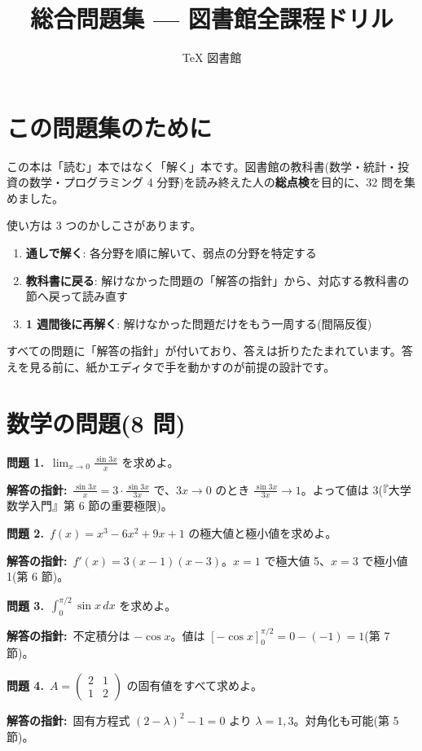 \documentclass{article}
\title{総合問題集 — 図書館全課程ドリル}
\author{TeX 図書館}
\begin{document}
\section{この問題集のために}

この本は「読む」本ではなく「解く」本です。図書館の教科書(数学・統計・投資の数学・プログラミング 4 分野)を読み終えた人の\textbf{総点検}を目的に、32 問を集めました。

使い方は 3 つのかしこさがあります。

\begin{enumerate}
\item \textbf{通しで解く}: 各分野を順に解いて、弱点の分野を特定する
\item \textbf{教科書に戻る}: 解けなかった問題の「解答の指針」から、対応する教科書の節へ戻って読み直す
\item \textbf{1 週間後に再解く}: 解けなかった問題だけをもう一周する(間隔反復)
\end{enumerate}

すべての問題に「解答の指針」が付いており、答えは折りたたまれています。答えを見る前に、紙かエディタで手を動かすのが前提の設計です。

\section{数学の問題(8 問)}

\textbf{問題 1.}\ \(\displaystyle \lim_{x \to 0} \frac{\sin 3x}{x} \) を求めよ。

\textbf{解答の指針:}\ \(\frac{\sin 3x}{x} = 3 \cdot \frac{\sin 3x}{3x}\) で、\(3x \to 0\) のとき \(\frac{\sin 3x}{3x} \to 1\)。よって値は 3(『大学数学入門』第 6 節の重要極限)。

\textbf{問題 2.}\ \(f(x) = x^3 - 6x^2 + 9x + 1\) の極大値と極小値を求めよ。

\textbf{解答の指針:}\ \(f'(x) = 3(x-1)(x-3)\)。\(x = 1\) で極大値 5、\(x = 3\) で極小値 1(第 6 節)。

\textbf{問題 3.}\ \(\displaystyle \int_0^{\pi/2} \sin x \, dx \) を求めよ。

\textbf{解答の指針:}\ 不定積分は \(-\cos x\)。値は \( [-\cos x]_0^{\pi/2} = 0 - (-1) = 1 \)(第 7 節)。

\textbf{問題 4.}\ \(A = \begin{pmatrix} 2 & 1 \\ 1 & 2 \end{pmatrix}\) の固有値をすべて求めよ。

\textbf{解答の指針:}\ 固有方程式 \((2-\lambda)^2 - 1 = 0\) より \(\lambda = 1, 3\)。対角化も可能(第 5 節)。
\end{document}
